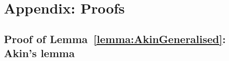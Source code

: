 \documentclass[9pt,twoside,lineno]{pnas-new}
\theoremstyle{plainCl1}
\theoremstyle{plainCl2}
\begin{document}
\clearpage
\newpage










\section{Appendix: Proofs}
\label{section:appendix}


\subsection{Proof of Lemma~\ref{lemma:AkinGeneralised}: Akin's lemma}
\end{document}
